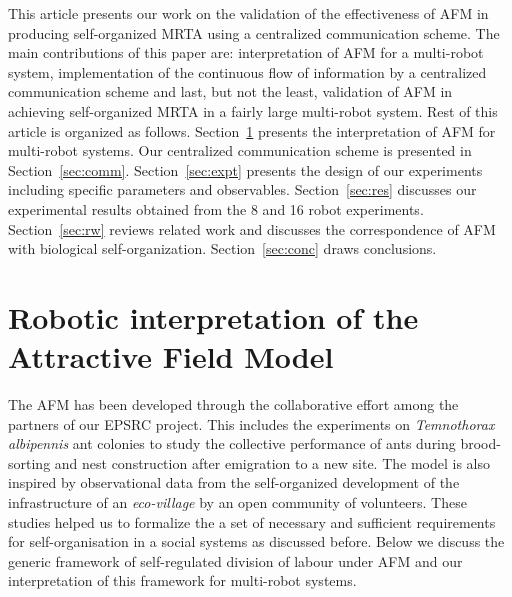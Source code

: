 \documentclass[smallcondensed]{svjour3}
\begin{document}
This article presents our work on the validation of the effectiveness of AFM in producing self-organized MRTA using a centralized communication scheme. The main contributions of this paper are: interpretation of AFM for a multi-robot system, implementation of the continuous flow of information by a centralized communication scheme and last, but not the least, validation of AFM in achieving self-organized MRTA in a fairly large multi-robot system. Rest of this article is organized as follows. Section~\ref{sec:afm} presents the interpretation of AFM for multi-robot systems.  Our centralized communication scheme is presented in Section~\ref{sec:comm}. Section~\ref{sec:expt} presents the design of our experiments including specific parameters and observables. Section~\ref{sec:res} discusses our experimental results obtained from the 8 and 16 robot experiments. Section~\ref{sec:rw} reviews related work and discusses the correspondence of AFM with biological self-organization. Section~\ref{sec:conc} draws conclusions.
\section{Robotic interpretation of the Attractive Field Model}
\label{sec:afm}
The AFM has been developed through the collaborative effort among the partners of our EPSRC project. This includes the experiments on {\em Temnothorax albipennis} ant colonies to study the collective performance of ants during brood-sorting and nest construction after emigration to a new site.  The model is also inspired by observational data from the self-organized development of the infrastructure of an {\em eco-village} by an open community of volunteers.  These studies helped us to formalize the a set of necessary and sufficient requirements for self-organisation in a social systems as discussed before. Below we discuss the generic framework of self-regulated division of labour under AFM and our interpretation of this framework for multi-robot systems.
\end{document}
